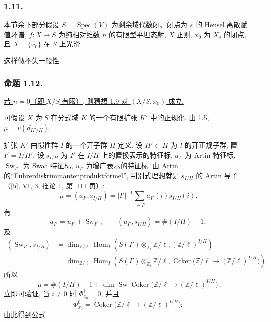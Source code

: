 \subsubsection*{1.11.}
本节余下部分假设 $S=\operatorname{Spec}(V)$ 为剩余域\underline{代数闭}、闭点为 $s$ 的 Hensel 离散赋值环谱, $f:X\to S$ 为纯相对维数 $n$ 的有限型平坦态射, $X$ 正则, $x_0$ 为 $X_s$ 的闭点, 且 $X-\{x_0\}$ 在 $S$ 上光滑.

这样做不失一般性.

\subsubsection*{命题 1.12.}
\underline{若 $n=0$（即 $X/S$ 有限）, 则猜想 1.9 对 $(X/S,x_0)$ 成立.}

可假设 $X$ 为 $S$ 在分式域 $K$ 的一个有限扩张 $K'$ 中的正规化. 由 1.5, $\mu=v(d_{K'/K})$.

扩张 $K'$ 由惯性群 $I$ 的一个开子群 $H$ 定义. 设 $H'\subset H$ 为 $I$ 的开正规子群, 置 $I'=I/H'$. 设 $s_{I/H}$ 为 $I'$ 在 $I/H$ 上的置换表示的特征标, $a_{I'}$ 为 Artin 特征标, $\operatorname{Sw}_{I'}$ 为 Swan 特征标, $u_{I'}$ 为增广表示的特征标. 由 Artin 的“F\"uhrerdiskriminantenproduktformel”, 判别式理想就是 $s_{I/H}$ 的 Artin 导子（[5], VI, 3, 推论 1, 第~111 页）:
\[
\mu=(a_{I'},s_{I/H})
=|I'|^{-1}\sum_{i\in I'}a_{I'}(i)s_{I/H}(i).
\]
有
\[
a_{I'}=u_{I'}+\operatorname{Sw}_{I'},
\qquad
(u_{I'},s_{I/H})=\#(I/H)-1,
\]
及
\begin{align*}
(\operatorname{Sw}_{I'},s_{I/H})
&=\dim_{\mathbb Z/\ell}\operatorname{Hom}_I\!\left(
S(I')\otimes_{\mathbb Z_\ell}\mathbb Z/\ell,
(\mathbb Z/\ell)^{I/H}\right)\\
&=\dim_{\mathbb Z/\ell}\operatorname{Hom}_I\!\left(
S(I')\otimes_{\mathbb Z_\ell}\mathbb Z/\ell,
\operatorname{Coker}\bigl(
\mathbb Z/\ell\longrightarrow(\mathbb Z/\ell)^{I/H}\bigr)
\right).
\end{align*}
所以
\[
\mu=\#(I/H)-1+
\dim\operatorname{Sw}\operatorname{Coker}\bigl(
\mathbb Z/\ell\longrightarrow(\mathbb Z/\ell)^{I/H}\bigr).
\]
立即可验证, 当 $i\ne0$ 时 $\Phi^i_{x_0}=0$, 并且
\[
\Phi^0_{x_0}=\operatorname{Coker}\bigl(
\mathbb Z/\ell\longrightarrow(\mathbb Z/\ell)^{I/H}\bigr);
\]
由此得到公式.
